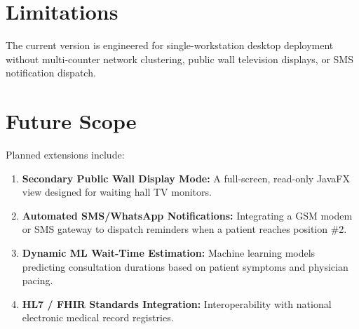 \documentclass[12pt,a4paper,oneside]{report}
\begin{document}
\section{Limitations}
The current version is engineered for single-workstation desktop deployment without multi-counter network clustering, public wall television displays, or SMS notification dispatch.

\section{Future Scope}
Planned extensions include:
\begin{enumerate}[leftmargin=0.8cm, itemsep=1pt]
    \item \textbf{Secondary Public Wall Display Mode:} A full-screen, read-only JavaFX view designed for waiting hall TV monitors.
    \item \textbf{Automated SMS/WhatsApp Notifications:} Integrating a GSM modem or SMS gateway to dispatch reminders when a patient reaches position \#2.
    \item \textbf{Dynamic ML Wait-Time Estimation:} Machine learning models predicting consultation durations based on patient symptoms and physician pacing.
    \item \textbf{HL7 / FHIR Standards Integration:} Interoperability with national electronic medical record registries.
\end{enumerate}
\end{document}
